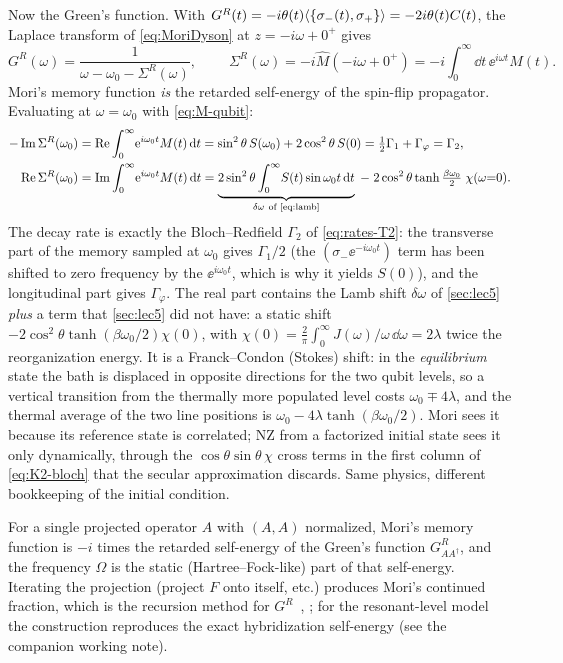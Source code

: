 \begin{exbox}[Example 8.1: $A=\sigma_-$ and the retarded self-energy]
Now the Green's function.
With $G^R(t)=-i\theta(t)\langle\{\sigma_-(t),\sigma_+\}\rangle=-2i\theta(t)C(t)$, the Laplace transform of \cref{eq:MoriDyson} at $z=-i\omega+0^+$ gives
\begin{equation}
  G^R(\omega)=\frac{1}{\omega-\omega_0-\Sigma^R(\omega)},\qquad
  \boxed{\;\Sigma^R(\omega)=-i\hat M(-i\omega+0^+)=-i\int_0^\infty\!\dd t\,\ee^{i\omega t}M(t).\;}
  \label{eq:SigmaR}
\end{equation}
Mori's memory function \emph{is} the retarded self-energy of the spin-flip propagator.
Evaluating at $\omega=\omega_0$ with \cref{eq:M-qubit}:
\begin{align}
  -\Im\Sigma^R(\omega_0)&=\Re\int_0^\infty\!\ee^{i\omega_0t}M(t)\,\dd t
  =\sin^2\theta\,S(\omega_0)+2\cos^2\theta\,S(0)=\tfrac12\Gamma_1+\Gamma_\varphi=\Gamma_2 ,\\
  \Re\Sigma^R(\omega_0)&=\Im\int_0^\infty\!\ee^{i\omega_0t}M(t)\,\dd t
  =\underbrace{2\sin^2\theta\int_0^\infty\!S(t)\sin\omega_0t\,\dd t}_{\delta\omega\ \text{of \cref{eq:lamb}}}
  \;-\;2\cos^2\theta\tanh\tfrac{\beta\omega_0}{2}\;\chi(\omega{=}0).
\end{align}
The decay rate is exactly the Bloch--Redfield $\Gamma_2$ of \cref{eq:rates-T2}: the transverse part of the memory sampled at $\omega_0$ gives $\Gamma_1/2$ (the $(\sigma_-\ee^{-i\omega_0t})$ term has been shifted to zero frequency by the $\ee^{i\omega_0t}$, which is why it yields $S(0)$), and the longitudinal part gives $\Gamma_\varphi$.
The real part contains the Lamb shift $\delta\omega$ of \cref{sec:lec5} \emph{plus} a term that \cref{sec:lec5} did not have: a static shift $-2\cos^2\theta\tanh(\beta\omega_0/2)\chi(0)$, with $\chi(0)=\tfrac2\pi\int_0^\infty J(\omega)/\omega\,\dd\omega=2\lambda$ twice the reorganization energy.
It is a Franck--Condon (Stokes) shift: in the \emph{equilibrium} state the bath is displaced in opposite directions for the two qubit levels, so a vertical transition from the thermally more populated level costs $\omega_0\mp4\lambda$, and the thermal average of the two line positions is $\omega_0-4\lambda\tanh(\beta\omega_0/2)$.
Mori sees it because its reference state is correlated; NZ from a factorized initial state sees it only dynamically, through the $\cos\theta\sin\theta\,\chi$ cross terms in the first column of \cref{eq:K2-bloch} that the secular approximation discards.
Same physics, different bookkeeping of the initial condition.
\end{exbox}

\begin{keybox}
For a single projected operator $A$ with $(A,A)$ normalized, Mori's memory function is $-i$ times the retarded self-energy of the Green's function $G^R_{AA^\dagger}$, and the frequency $\Omega$ is the static (Hartree--Fock-like) part of that self-energy.
Iterating the projection (project $F$ onto itself, etc.) produces Mori's continued fraction, which is the recursion method for $G^R$~\cite[Ch.~8]{ZwanzigBook}, \cite[Sec.~5.3]{Forster1975}; for the resonant-level model the construction reproduces the exact hybridization self-energy (see the companion working note).
\end{keybox}

